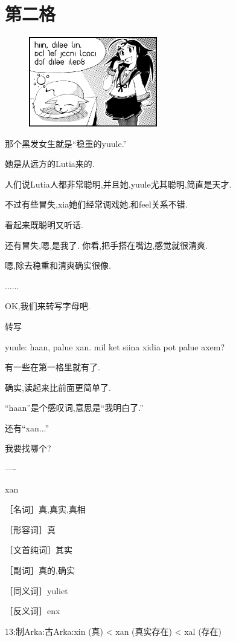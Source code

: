 \chapter{第二格}
\begin{figure}[H]
\includegraphics[width=0.5\textwidth]{ARKA/uni2.png}%
\end{figure}



那个黑发女生就是``稳重的yuule.''

她是从远方的Lutia来的.

人们说Lutia人都非常聪明,并且她,yuule尤其聪明,简直是天才.

不过有些冒失,xia她们经常调戏她.和feel关系不错.


看起来既聪明又听话.

还有冒失,嗯,是我了. 你看,把手搭在嘴边,感觉就很清爽.


嗯,除去稳重和清爽确实很像.


......

OK,我们来转写字母吧.

\FiveStar 转写

yuule: haan, palue xan. mil ket siina xidia pot palue axem?


有一些在第一格里就有了.


确实,读起来比前面更简单了.

``haan''是个感叹词,意思是``我明白了.''

还有``xan...''

我要找哪个?

----

xan

［名词］真,真实,真相

［形容词］真

［文首纯词］其实

［副词］真的,确实

［同义词］yuliet

［反义词］enx

13:制Arka:古Arka:xin (真) < xan (真实存在) < xal (存在)

